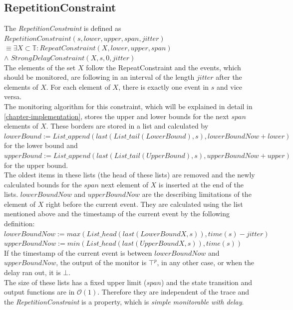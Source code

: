\subsection{RepetitionConstraint}
	The \emph{RepetitionConstraint} is defined as\\[10pt]
		$RepetitionConstraint(s, lower, upper, span, jitter)$\\
		$\equiv \exists X\subset \mathbb{T}: RepeatConstraint (X, lower, upper, span)$\\
		\hspace{7cm}$\land$ $StrongDelayConstraint(X, s, 0, jitter)$\\[10pt]
	The elements of the set $X$ follow the RepeatConstraint and the events, which should be monitored, are following in an interval of the length $jitter$ after the elements of $X$. For each element of $X$, there is exactly one event in $s$ and vice versa.\\
	The monitoring algorithm for this constraint, which will be explained in detail in \ref{chapter-implementation}, stores the upper and lower bounds for the next $span$ elements of $X$.
	These borders are stored in a list and calculated by\\[10pt]
	$lowerBound:= List\_append(last(List\_tail(LowerBound), s), lowerBoundNow + lower)$ \\for the lower bound and\\
	$upperBound:= List\_append(last(List\_tail(UpperBound), s), upperBoundNow + upper)$ \\for the upper bound.\\[10pt]
	The oldest items in these lists (the head of these lists) are removed and the newly calculated bounds for the $span$ next element of $X$ is inserted at the end of the lists. $lowerBoundNow$ and $upperBoundNow$ are the describing limitations of the element of $X$ right before the current event. They are calculated using the list mentioned above and the timestamp of the current event by the following definition:\\[10pt]
	$lowerBoundNow:= max(List\_head(last(LowerBoundX, s)), time(s)-jitter)$\\
	$upperBoundNow:= min(List\_head(last(UpperBoundX, s)), time(s))$\\[10pt]
	If the timestamp of the current event is between $lowerBoundNow$ and $upperBoundNow$, the output of the monitor is $\top^p$, in any other case, or when the delay ran out, it is $\bot$.\\
	The size of these lists has a fixed upper limit ($span$) and the state transition and output functions are in $\mathcal{O}(1)$. Therefore they are independent of the trace and the \emph{RepetitionConstraint} is a property, which is \textit{simple monitorable with delay}.
	
